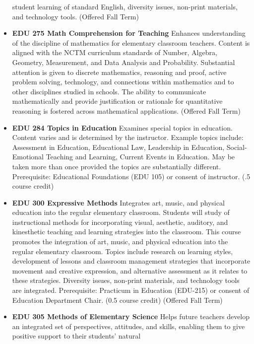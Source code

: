 \documentclass[
  letterpaper,
]{scrbook}
\begin{document}
\begin{itemize}
  student learning of standard English, diversity issues, non-print
  materials, and technology tools. (Offered Fall Term)\\
\item
  \textbf{EDU 275 Math Comprehension for Teaching} Enhances
  understanding of the discipline of mathematics for elementary
  classroom teachers. Content is aligned with the NCTM curriculum
  standards of Number, Algebra, Geometry, Measurement, and Data Analysis
  and Probability. Substantial attention is given to discrete
  mathematics, reasoning and proof, active problem solving, technology,
  and connections within mathematics and to other disciplines studied in
  schools. The ability to communicate mathematically and provide
  justification or rationale for quantitative reasoning is fostered
  across mathematical applications. (Offered Fall Term)\\
\item
  \textbf{EDU 284 Topics in Education} Examines special topics in
  education. Content varies and is determined by the instructor. Example
  topics include: Assessment in Education, Educational Law, Leadership
  in Education, Social-Emotional Teaching and Learning, Current Events
  in Education. May be taken more than once provided the topics are
  substantially different. Prerequisite: Educational Foundations (EDU
  105) or consent of instructor. (.5 course credit)\\
\item
  \textbf{EDU 300 Expressive Methods} Integrates art, music, and
  physical education into the regular elementary classroom. Students
  will study of instructional methods for incorporating visual,
  aesthetic, auditory, and kinesthetic teaching and learning strategies
  into the classroom. This course promotes the integration of art,
  music, and physical education into the regular elementary classroom.
  Topics include research on learning styles, development of lessons and
  classroom management strategies that incorporate movement and creative
  expression, and alternative assessment as it relates to these
  strategies. Diversity issues, non-print materials, and technology
  tools are integrated. Prerequisite: Practicum in Education (EDU-215)
  or consent of Education Department Chair. (0.5 course credit) (Offered
  Fall Term)\\
\item
  \textbf{EDU 305 Methods of Elementary Science} Helps future teachers
  develop an integrated set of perspectives, attitudes, and skills,
  enabling them to give positive support to their students' natural

\end{itemize}
\end{document}
